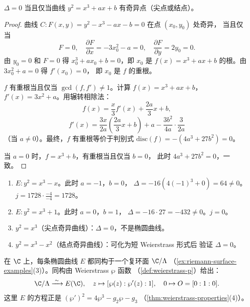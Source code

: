 \begin{proposition}
\label{prop:discriminant-smooth}
$\Delta = 0$ 当且仅当曲线 $y^2 = x^3 + ax + b$ 有奇异点（尖点或结点）。
\end{proposition}

\begin{proof}
曲线 $C\colon F(x,y) = y^2 - x^3 - ax - b = 0$ 在点 $(x_0, y_0)$ 处奇异，
当且仅当
\[
  F = 0, \quad \frac{\partial F}{\partial x} = -3x_0^2 - a = 0,
  \quad \frac{\partial F}{\partial y} = 2y_0 = 0.
\]
由 $y_0 = 0$ 和 $F = 0$ 得 $x_0^3 + ax_0 + b = 0$，即 $x_0$ 是
$f(x) = x^3 + ax + b$ 的根。由 $3x_0^2 + a = 0$ 得 $f'(x_0) = 0$，
即 $x_0$ 是 $f$ 的重根。

$f$ 有重根当且仅当 $\gcd(f, f') \neq 1$。计算 $f(x) = x^3 + ax + b$，
$f'(x) = 3x^2 + a$。用辗转相除法：
\[
  f(x) = \frac{x}{3} f'(x) + \frac{2a}{3}x + b,
\]
\[
  f'(x) = \frac{3x}{2a}\left(\frac{2a}{3}x + b\right)
  + a - \frac{3b^2}{4a} \cdot \frac{3}{2a}
\]
（当 $a \neq 0$）。最终，$f$ 有重根等价于判别式
$\mathrm{disc}(f) = -(4a^3 + 27b^2) = 0$。

当 $a = 0$ 时，$f = x^3 + b$，有重根当且仅当 $b = 0$，
此时 $4a^3 + 27b^2 = 0$，一致。
\end{proof}

\begin{example}
\label{ex:elliptic-curves-examples}
\leavevmode
\begin{enumerate}
  \item $E\colon y^2 = x^3 - x$。此时 $a = -1$，$b = 0$，
    $\Delta = -16(4(-1)^3 + 0) = 64 \neq 0$。
    $j = 1728 \cdot \frac{-4}{-4} = 1728$。
  \item $E\colon y^2 = x^3 + 1$。此时 $a = 0$，$b = 1$，
    $\Delta = -16 \cdot 27 = -432 \neq 0$。$j = 0$。
  \item $y^2 = x^3$（尖点奇异曲线）：$\Delta = 0$，不是椭圆曲线。
  \item $y^2 = x^3 - x^2$（结点奇异曲线）：可化为短 Weierstrass 形式后
    验证 $\Delta = 0$。
\end{enumerate}
\end{example}

\begin{remark}[与复环面的联系]
\label{rem:ec-torus}
在 $\C$ 上，每条椭圆曲线 $E$ 都同构于一个复环面 $\C/\Lambda$
（\cref{ex:riemann-surface-examples}(3)）。同构由 Weierstrass $\wp$ 函数
（\cref{def:weierstrass-p}）给出：
\[
  \C/\Lambda \xrightarrow{\;\sim\;} E(\C), \quad
  z \mapsto [\wp(z) : \wp'(z) : 1], \quad 0 \mapsto O = [0:1:0].
\]
这里 $E$ 的方程正是 $(\wp')^2 = 4\wp^3 - g_2\wp - g_3$
（\cref{thm:weierstrass-properties}(4)）。
\end{remark}


